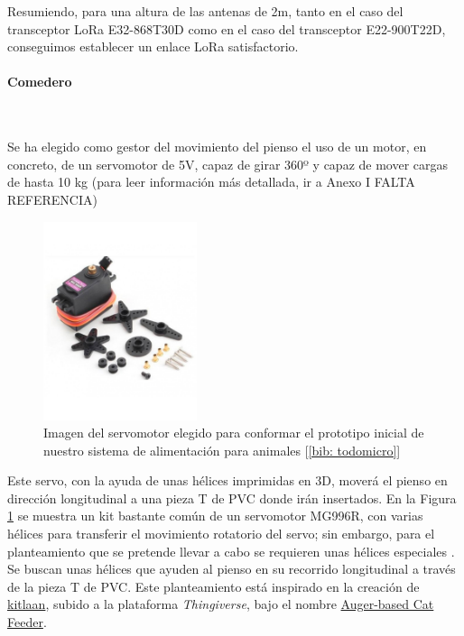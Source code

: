 \documentclass[12pt]{article}
\newcommand{\subsubsubsection}[1]{\paragraph{#1}\mbox{}\\}
\begin{document}
	\noindent Resumiendo, para una altura de las antenas de 2m, tanto en el caso del transceptor LoRa E32-868T30D como en el caso del transceptor E22-900T22D, conseguimos establecer un enlace LoRa satisfactorio.
	
	\pagebreak
	
	
	
	\subsubsubsection{Comedero}
	\label{subsubsubsection: comedero eleccion}
	
	 \noindent Se ha elegido como gestor del movimiento del pienso el uso de un motor, en concreto, de un servomotor de 5V, capaz de girar 360º y capaz de mover cargas de hasta 10 kg (para leer información más detallada, ir a Anexo I FALTA REFERENCIA) \\
	
		\begin{figure}[h]
		\begin{center}
			\includegraphics[width=0.4\textwidth]{img/servo_mg996r.jpg}
			\caption{Imagen del servomotor elegido para conformar el prototipo inicial de nuestro sistema de alimentación para animales [\ref{bib: todomicro}]}
			\label{Imagen servomotor MG996R}
		\end{center}
	\end{figure}
	
	\noindent Este servo, con la ayuda de unas hélices imprimidas en 3D, moverá el pienso en dirección longitudinal a una pieza T de PVC donde irán insertados. En la Figura \ref{Imagen servomotor MG996R} se muestra un kit bastante común de un servomotor MG996R, con varias hélices para transferir el movimiento rotatorio del servo; sin embargo, para el planteamiento que se pretende llevar a cabo se requieren unas hélices especiales . Se buscan unas hélices que ayuden al pienso en su recorrido longitudinal a través de la pieza T de PVC. Este planteamiento está inspirado en la creación de \href{https://www.thingiverse.com/kitlaan/designs}{kitlaan}, subido a la plataforma  \textit{Thingiverse}, bajo el nombre \href{https://www.thingiverse.com/thing:27854}{Auger-based Cat Feeder}.  \\
	
\end{document}
